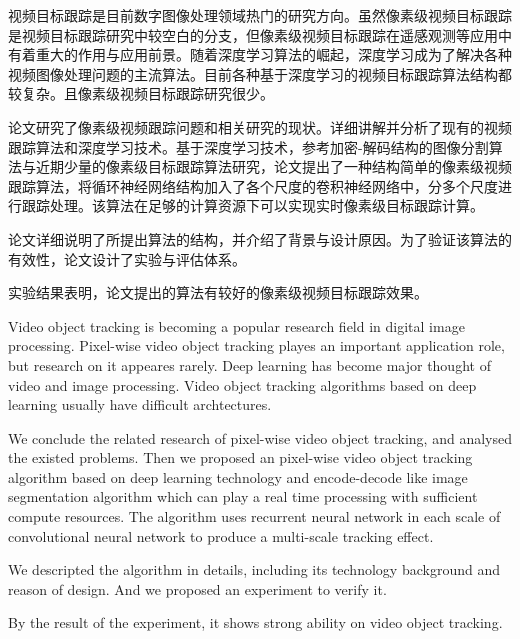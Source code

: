 
\begin{cabstract}
	视频目标跟踪是目前数字图像处理领域热门的研究方向。虽然像素级视频目标跟踪是视频目标跟踪研究中较空白的分支，但像素级视频目标跟踪在遥感观测等应用中有着重大的作用与应用前景。随着深度学习算法的崛起，深度学习成为了解决各种视频图像处理问题的主流算法。目前各种基于深度学习的视频目标跟踪算法结构都较复杂。且像素级视频目标跟踪研究很少。
	\par
	论文研究了像素级视频跟踪问题和相关研究的现状。详细讲解并分析了现有的视频跟踪算法和深度学习技术。基于深度学习技术，参考加密-解码结构的图像分割算法与近期少量的像素级目标跟踪算法研究，论文提出了一种结构简单的像素级视频跟踪算法，将循环神经网络结构加入了各个尺度的卷积神经网络中，分多个尺度进行跟踪处理。该算法在足够的计算资源下可以实现实时像素级目标跟踪计算。
	\par
	论文详细说明了所提出算法的结构，并介绍了背景与设计原因。为了验证该算法的有效性，论文设计了实验与评估体系。
	\par
	实验结果表明，论文提出的算法有较好的像素级视频目标跟踪效果。
\end{cabstract}

\begin{eabstract} %
	Video object tracking is becoming a popular research field in digital image processing. Pixel-wise video object tracking playes an important application role, but research on it appeares rarely. Deep learning has become major thought of video and image processing. Video object tracking algorithms based on deep learning usually have difficult archtectures. 
	\par
	We conclude the related research of pixel-wise video object tracking, and analysed the existed problems. Then we proposed an pixel-wise video object tracking algorithm based on deep learning technology and encode-decode like image segmentation algorithm which can play a real time processing with sufficient compute resources. The algorithm uses recurrent neural network in each scale of convolutional neural network to produce a multi-scale tracking effect.
	\par
	We descripted the algorithm in details, including its technology background and reason of design. And we proposed an experiment to verify it.
	\par
	By the result of the experiment, it shows strong ability on video object tracking.
\end{eabstract}

